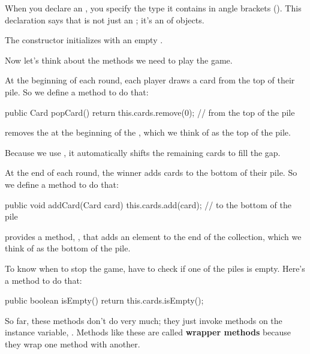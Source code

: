 When you declare an , you specify the type it contains in angle brackets (\java{<>}).
This declaration says that  is not just an ; it's an  of  objects.

The constructor initializes  with an empty .


Now let's think about the methods we need to play the game.

At the beginning of each round, each player draws a card from the top of their pile.
So we define a method to do that:

\begin{code}
public Card popCard() {
    return this.cards.remove(0);  // from the top of the pile
}
\end{code}

 removes the  at the beginning of the , which we think of as the top of the pile.

Because we use , it automatically shifts the remaining cards to fill the gap.

At the end of each round, the winner adds cards to the bottom of their pile.
So we define a method to do that:

\begin{code}
public void addCard(Card card) {
    this.cards.add(card);        // to the bottom of the pile
}
\end{code}

 provides a method, , that adds an element to the end of the collection, which we think of as the bottom of the pile.

To know when to stop the game, have to check if one of the piles is empty.
Here's a method to do that: 

\begin{code}
public boolean isEmpty() {
    return this.cards.isEmpty();
}
\end{code}

So far, these methods don't do very much; they just invoke methods on the instance variable, .
Methods like these are called {\bf wrapper methods} because they wrap one method with another.


